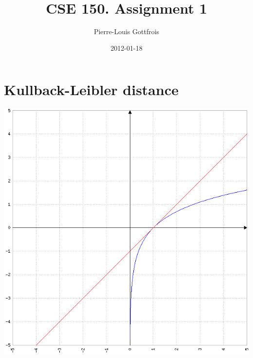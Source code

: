 \documentclass[]{article}
\title{CSE 150. Assignment 1}
\author{Pierre-Louis Gottfrois}
\date{2012-01-18}
\begin{document}
\ifpdf
{}
\else
{}
\fi

\maketitle

\section{Kullback-Leibler distance}

\begin{center}
  \includegraphics[scale=0.7]{hw1.png}
\end{center}

\newpage
\end{document}
